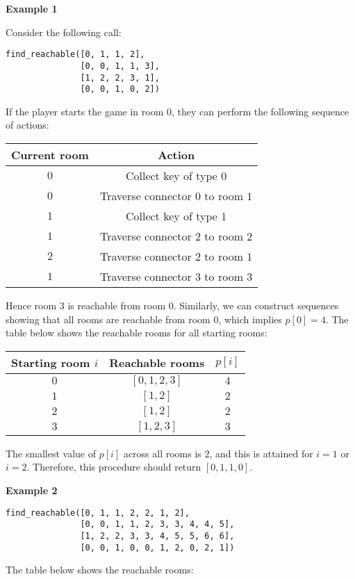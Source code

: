 \textbf{Example 1}

Consider the following call:

\begin{verbatim}
find_reachable([0, 1, 1, 2],
               [0, 0, 1, 1, 3], 
               [1, 2, 2, 3, 1], 
               [0, 0, 1, 0, 2])
\end{verbatim}

If the player starts the game in room $0$, they can perform the following sequence of actions:

\begin{center}
\renewcommand{\arraystretch}{1.5}
\begin{tabular}{|c|c|}
\hline
Current room & Action \\
\hline
$0$ & Collect key of type $0$ \\
\hline
$0$ & Traverse connector $0$ to room $1$ \\
\hline
$1$ & Collect key of type $1$ \\
\hline
$1$ & Traverse connector $2$ to room $2$ \\
\hline
$2$ & Traverse connector $2$ to room $1$ \\
\hline
$1$ & Traverse connector $3$ to room $3$ \\
\hline
\end{tabular}
\end{center}

Hence room $3$ is reachable from room $0$. Similarly, we can construct sequences showing that all
rooms are reachable from room $0$, which implies $p[0]=4$. The table below shows the reachable
rooms for all starting rooms:

\begin{center}
\renewcommand{\arraystretch}{1.5}
\begin{tabular}{|c|c|c|}
\hline
Starting room $i$ & Reachable rooms & $p[i]$ \\
\hline
$0$ & $[0,1,2,3]$ & $4$\\
\hline
$1$ & $[1,2]$ & $2$\\
\hline
$2$ & $[1,2]$ & $2$\\
\hline
$3$ & $[1,2,3]$ & $3$\\
\hline
\end{tabular}
\end{center}
The smallest value of $p[i]$ across all rooms is $2$, and this is attained for $i=1$ or $i=2$. Therefore,
this procedure should return $[0,1,1,0]$.



\textbf{Example 2}
\begin{verbatim}
find_reachable([0, 1, 1, 2, 2, 1, 2],
               [0, 0, 1, 1, 2, 3, 3, 4, 4, 5],
               [1, 2, 2, 3, 3, 4, 5, 5, 6, 6],
               [0, 0, 1, 0, 0, 1, 2, 0, 2, 1])
\end{verbatim}
The table below shows the reachable rooms:

